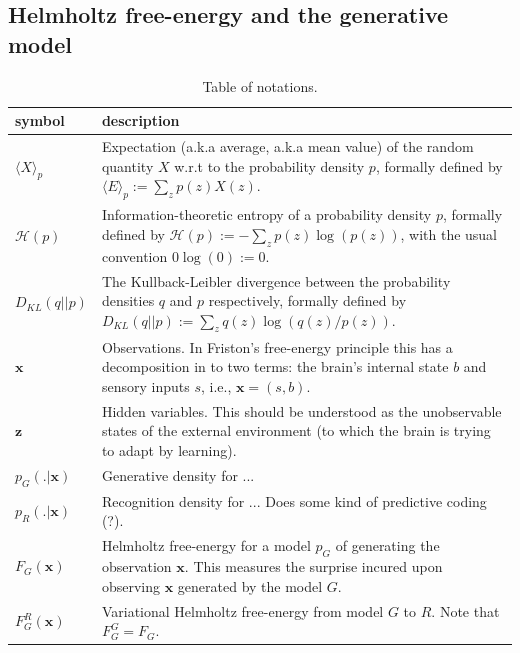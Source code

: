 \documentclass[10pt,letterpaper]{article}
\def\z{\mathbf{z}}
\def\x{\mathbf{x}}
\begin{document}

\subsection{Helmholtz free-energy and the generative model}
\begin{table}[H]
  \begin{tabular}{p{2cm}|p{11cm}}
         \hline
         \textbf{symbol}    & \textbf{description}  \\ \hline
         $\langle X\rangle_p$ & Expectation (a.k.a average, a.k.a mean value) of the
         random quantity $X$ w.r.t to the probability density $p$, formally defined by $\langle E\rangle_p := \sum_{z}p(z)X(z)$.\\ \hline
         $\mathcal H(p)$ & Information-theoretic entropy of a probability density $p$, formally defined by $\mathcal H(p) := -\sum_{z}p(z)\log(p(z))$,
          with the usual convention $0 \log(0) := 0$.\\ \hline
         $D_{KL}(q||p)$ & The Kullback-Leibler divergence between the probability densities $q$ and $p$ respectively, formally defined by $D_{KL}(q||p) := \sum_{z}q(z)\log(q(z)/p(z))$.\\ \hline
             $\x$ & Observations. In Friston's free-energy principle this has a decomposition in to two terms: the brain's internal state $b$ and sensory inputs $s$, i.e., $\x = (s, b).$ \\ \hline
             $\z$ & Hidden variables. This should be understood as the unobservable states of the external environment (to which the brain is trying to adapt by learning).\\ \hline
             $p_G(.|\x)$ & Generative density for ...\\ \hline
         $p_R(.|\x)$ & Recognition density for ... Does some kind of predictive coding (?).\\ \hline
         $F_G(\x)$ & Helmholtz free-energy for a model $p_G$ of generating the observation $\x$. This measures the surprise incured upon observing $\x$ generated by the model $G$.\\ \hline
         $F^R_G(\x)$ & Variational Helmholtz free-energy from model $G$
          to $R$.  Note that $F^G_G = F_G$.\\ \hline
  \end{tabular}
  \caption{Table of notations.}
\end{table}
\end{document}
